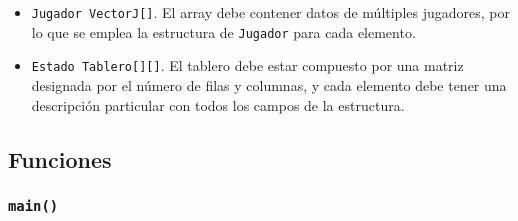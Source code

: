 \documentclass[12pt]{article}
\begin{document}
\begin{itemize}

\item \texttt{Jugador VectorJ[]}. El array debe contener datos de
múltiples jugadores, por lo que se emplea la estructura de
\texttt{Jugador} para cada elemento.

\item \texttt{Estado Tablero[][]}. El tablero debe estar compuesto por
una matriz designada por el número de filas y columnas, y cada elemento debe
tener una descripción particular con todos los campos de la estructura.

\end{itemize}

\subsection*{Funciones}

\subsubsection*{\texttt{main()}}
\end{document}
